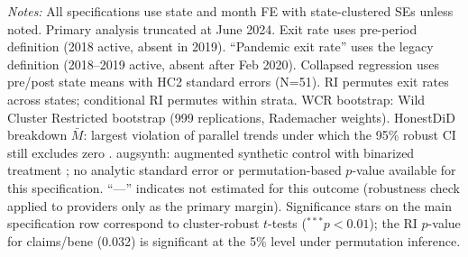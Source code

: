 \begin{table}[t]
\begin{tabular}{lccc}
\bottomrule
\end{tabular}
\begin{minipage}{0.9\textwidth}
\vspace{0.2cm}
\footnotesize \textit{Notes:} All specifications use state and month FE with state-clustered SEs unless noted. Primary analysis truncated at June 2024. Exit rate uses pre-period definition (2018 active, absent in 2019). ``Pandemic exit rate'' uses the legacy definition (2018--2019 active, absent after Feb 2020). Collapsed regression uses pre/post state means with HC2 standard errors (N=51). RI permutes exit rates across states; conditional RI permutes within strata. WCR bootstrap: Wild Cluster Restricted bootstrap (999 replications, Rademacher weights). HonestDiD breakdown $\bar{M}$: largest violation of parallel trends under which the 95\% robust CI still excludes zero \citep{rambachan2023}. augsynth: augmented synthetic control with binarized treatment \citep{benmichael2021}; no analytic standard error or permutation-based $p$-value available for this specification. ``---'' indicates not estimated for this outcome (robustness check applied to providers only as the primary margin). Significance stars on the main specification row correspond to cluster-robust $t$-tests ($^{***}p < 0.01$); the RI $p$-value for claims/bene (0.032) is significant at the 5\% level under permutation inference.
\end{minipage}
\end{table}
